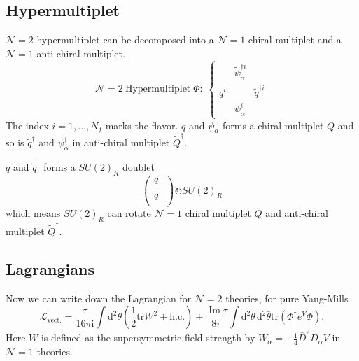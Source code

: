 \documentclass{article}
\begin{document}
\subsection{Hypermultiplet}
$\mathcal{N}=2$ hypermultiplet can be decomposed into a $\mathcal{N}=1$ chiral multiplet and a $\mathcal{N}=1$ anti-chiral multiplet.
\begin{equation}
\mathcal{N}=2\ \text{Hypermultiplet}\;\Phi:\ \left\{
\begin{matrix}
 &\tilde{\psi}^{\dagger i}_{\alpha}& \\
q^i& &\tilde{q}^{\dagger i}
\\&\psi_{\alpha}^i& 
\end{matrix}
\right.
\end{equation}
The index $i=1,...,N_f$ marks the flavor. $q$ and $\psi_\alpha$ forms a chiral multiplet $Q$ and so is $\tilde{q}^{\dagger}$ and $\psi^{\dagger}_\alpha$ in anti-chiral multiplet $\tilde{Q}^{\dagger}$. 

$q$ and $\tilde{q}^{\dagger}$ forms a $SU(2)_R$ doublet
\begin{equation}
\begin{pmatrix}
q\\
\tilde{q}^{\dagger}\\\end{pmatrix}\circlearrowright SU(2)_R
\end{equation}
which means $SU(2)_R$ can rotate $\mathcal{N}=1$ chiral multiplet $Q$ and anti-chiral multiplet $\tilde{Q}^{\dagger}$.

\subsection{Lagrangians}
\label{Lagrangians}
Now we can write down the Lagrangian for $\mathcal{N}=2$ theories, for pure Yang-Mills
\begin{equation}
\mathcal{L}_{\mathrm{vect.}}=\frac{\tau}{16\pi \mathrm{i}} \int \mathrm{d}^{2} \theta\left(\frac{1}{2} \mathrm{tr} W^{2}+\mathrm{h.c.}\right)
+\frac{\operatorname{Im}\tau}{8\pi} \int \mathrm{d}^{2} \theta\,\mathrm{d}^{2} \bar{\theta}\mathrm{tr}\left(\Phi^{\dagger} e^{V} \Phi\right).
\end{equation}
Here $W$ is defined as the supersymmetric field strength by $W_{\alpha}=-\frac{1}{4} \bar{D}^{2} D_{\alpha} V$ in $\mathcal{N}=1$ theories.
\end{document}
